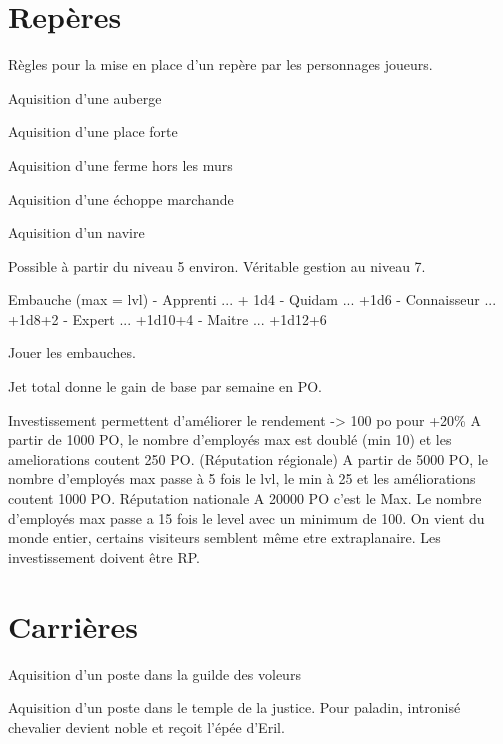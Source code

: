 \section*{Repères}
 Règles pour la mise en place d'un repère par les personnages joueurs.

Aquisition d'une auberge

Aquisition d'une place forte

Aquisition d'une ferme hors les murs

Aquisition d'une échoppe marchande

Aquisition d'un navire


Possible à partir du niveau 5 environ. Véritable gestion au niveau 7.

Embauche (max = lvl)
 - Apprenti ... + 1d4
 - Quidam ... +1d6
 - Connaisseur ... +1d8+2
 - Expert ... +1d10+4
 - Maitre ... +1d12+6

Jouer les embauches.

Jet total donne le gain de base par semaine en PO.

Investissement permettent d'améliorer le rendement -> 100 po pour +20\%
A partir de 1000 PO, le nombre d'employés max est doublé (min 10) et les
ameliorations coutent 250 PO. (Réputation régionale)
A partir de 5000 PO, le nombre d'employés max passe à 5 fois le lvl, le min
à 25 et les améliorations coutent 1000 PO. Réputation nationale
A 20000 PO c'est le Max. Le nombre d'employés max passe a 15 fois le level
avec un minimum de 100. On vient du monde entier, certains visiteurs 
semblent même etre extraplanaire. Les investissement doivent être RP.

\section*{Carrières}

Aquisition d'un poste dans la guilde des voleurs

Aquisition d'un poste dans le temple de la justice.
Pour paladin, intronisé chevalier devient noble et reçoit l'épée d'Eril.


